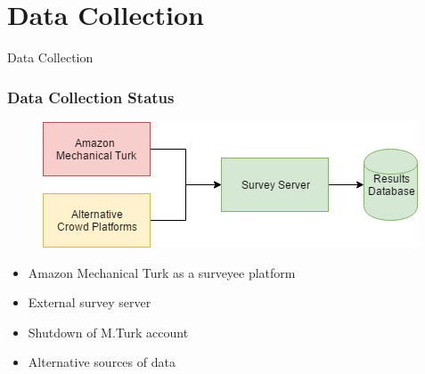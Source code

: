 \section{Data Collection}

\begin{frame}
     \begin{center}
     	\huge Data Collection
     \end{center}
\end{frame}

\begin{frame}
\frametitle{Data Collection Status}
\begin{figure}
	\centering
	\includegraphics[scale=.5]{graphics/surveystatus.png}
\end{figure}
\begin{itemize}
	\item Amazon Mechanical Turk as a surveyee platform
	\item External survey server
	\item Shutdown of M.Turk account
	\item Alternative sources of data
\end{itemize}
\end{frame}

